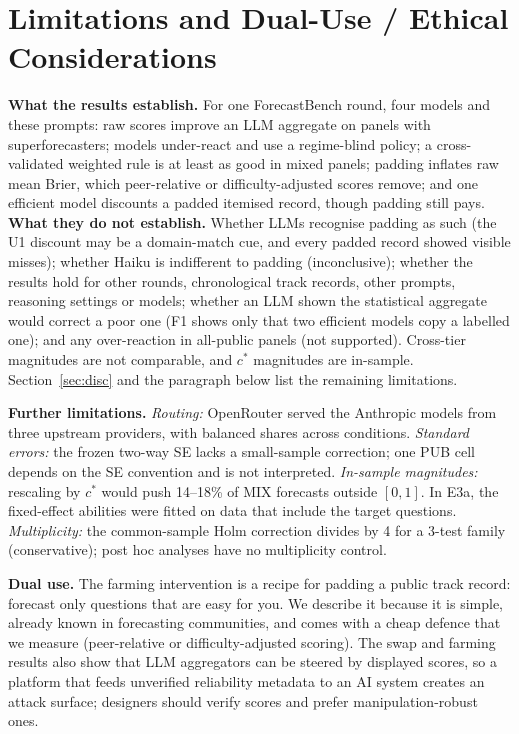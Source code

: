 \documentclass[11pt,letterpaper]{article}
\newcommand{\cstar}{c^{*}}
\begin{document}



\appendix
\small\linespread{0.97}\selectfont
\section{Limitations and Dual-Use / Ethical Considerations}\label{app:ethics}
\textbf{What the results establish.} For one ForecastBench round, four models and these prompts: raw scores improve
an LLM aggregate on panels with superforecasters; models under-react and use a regime-blind policy; a cross-validated
weighted rule is at least as good in mixed panels; padding inflates raw mean Brier, which peer-relative or
difficulty-adjusted scores remove; and one efficient model discounts a padded itemised record, though padding still pays.
\textbf{What they do not establish.} Whether LLMs recognise padding as such (the U1 discount may be a domain-match
cue, and every padded record showed visible misses); whether Haiku is indifferent to padding (inconclusive); whether the results
hold for other rounds, chronological track records, other prompts, reasoning settings or models; whether an LLM shown the
statistical aggregate would correct a poor one (F1 shows only that two efficient models copy a labelled one); and any over-reaction in all-public panels (not supported). Cross-tier
magnitudes are not comparable, and $\cstar$ magnitudes are in-sample. Section~\ref{sec:disc} and the paragraph below list the
remaining limitations.

\textbf{Further limitations.} \emph{Routing:}
OpenRouter served the Anthropic models from three upstream providers, with balanced shares across conditions.
\emph{Standard errors:} the frozen two-way SE lacks a small-sample correction; one PUB cell depends on the SE
convention and is not interpreted. \emph{In-sample magnitudes:} rescaling by $\cstar$ would push 14--18\% of MIX
forecasts outside $[0,1]$. In E3a, the fixed-effect abilities were fitted on data that include the target questions. \emph{Multiplicity:} the common-sample Holm correction divides by 4 for a
3-test family (conservative); post hoc analyses have no multiplicity control.

\textbf{Dual use.} The farming intervention is a recipe for padding a public track record: forecast only questions
that are easy for you. We describe it because it is simple, already known in forecasting communities, and comes with
a cheap defence that we measure (peer-relative or difficulty-adjusted scoring). The swap and farming results also show
that LLM aggregators can be steered by displayed scores, so a platform that feeds unverified reliability metadata to an
AI system creates an attack surface; designers should verify scores and prefer manipulation-robust ones.
\end{document}
